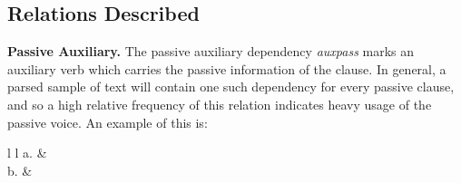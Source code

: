 \documentclass[main.tex]{subfiles}
\begin{document}

\subsection{Relations Described}

\textbf{Passive Auxiliary.} The passive auxiliary dependency \textit{auxpass} marks an auxiliary verb which carries the passive information of the clause. In general, a parsed sample of text will contain one such dependency for every passive clause, and so a high relative frequency of this relation indicates heavy usage of the passive voice. An example 
\citep{typed-deps-manual} of this is:
\newline\newline\begin{tabular}{ l l }
a. & \\
b. & 
\end{tabular}
\newline
\end{document}
